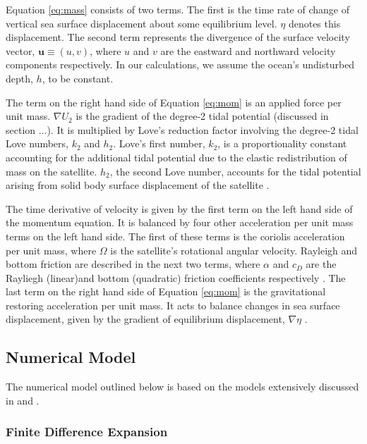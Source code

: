 Equation \ref{eq:mass} consists of two terms. The first is the time rate of change of vertical sea surface displacement about some equilibrium level. $\eta$ denotes this displacement. The second term represents the divergence of the surface velocity vector, $\bm{u} \equiv (u, v)$, where $u$ and $v$ are the eastward and northward velocity components respectively. In our calculations, we assume the ocean's undisturbed depth, $h$, to be constant. 

The term on the right hand side of Equation \ref{eq:mom} is an applied force per unit mass. $\nabla U_2$ is the gradient of the degree-2 tidal potential (discussed in section ...). It is multiplied by Love's reduction factor involving the degree-2 tidal Love numbers, $k_2$ and $h_2$. Love's first number, $k_2$, is a proportionality constant accounting for the additional tidal potential due to the elastic redistribution of mass on the satellite. $h_2$, the second Love number, accounts for the tidal potential arising from solid body surface displacement of the satellite \citep{love1911some}.

The time derivative of velocity is given by the first term on the left hand side of the momentum equation. It is balanced by four other acceleration per unit mass terms on the left hand side. The first of these terms is the coriolis acceleration per unit mass, where $\Omega$ is the satellite's rotational angular velocity. Rayleigh and bottom friction are described in the next two terms, where $\alpha$ and $c_D$ are the Rayliegh (linear)and bottom (quadratic) friction coefficients respectively \citep{sears1995tidal,chen2013tidal}. The last term on the right hand side of Equation \ref{eq:mom} is the gravitational restoring acceleration per unit mass. It acts to balance changes in sea surface displacement, given by the gradient of equilibrium displacement, $\nabla \eta$ .

\subsection{Numerical Model \label{subsec:model}}

The numerical model outlined below is based on the models extensively discussed in \citet{zahel1973diurnalk,zahel1978influence} and \citet{sears1994tidal,sears1995tidal}.

\subsubsection{Finite Difference Expansion}

